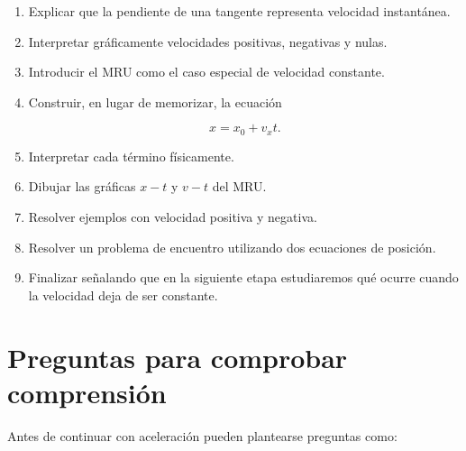 \begin{notapedagogica}
\begin{enumerate}
    \item Explicar que la pendiente de una tangente representa velocidad
    instantánea.

    \item Interpretar gráficamente velocidades positivas, negativas y nulas.

    \item Introducir el MRU como el caso especial de velocidad constante.

    \item Construir, en lugar de memorizar, la ecuación

    \[
    x=x_0+v_xt.
    \]

    \item Interpretar cada término físicamente.

    \item Dibujar las gráficas \(x-t\) y \(v-t\) del MRU.

    \item Resolver ejemplos con velocidad positiva y negativa.

    \item Resolver un problema de encuentro utilizando dos ecuaciones de
    posición.

    \item Finalizar señalando que en la siguiente etapa estudiaremos qué
    ocurre cuando la velocidad deja de ser constante.

\end{enumerate}
\end{notapedagogica}


\section{Preguntas para comprobar comprensión}

Antes de continuar con aceleración pueden plantearse preguntas como:

